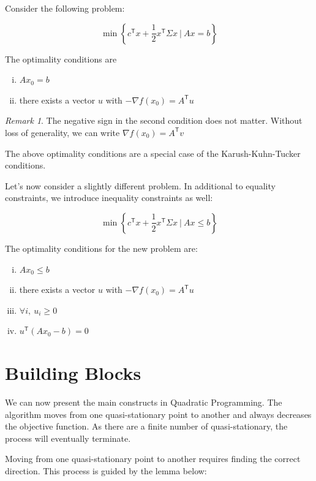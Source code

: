 \documentclass[letterpaper, oneside]{book}
\theoremstyle{definition}
\theoremstyle{remark}
\newtheorem*{remark}{Remark}
\begin{document}
Consider the following problem:

\[
	\min \left\{c^{\mathsf{T}}x + \frac{1}{2}x^{\mathsf{T}}\Sigma{}x \ |\  Ax = b \right\}
\]

The optimality conditions are
\begin{enumerate}[(i)]
	\item $Ax_0 = b$
	\item there exists a vector $u$ with $-\nabla f(x_0) = A^{\mathsf{T}}u$
\end{enumerate}

\begin{remark}
	The negative sign in the second condition does not matter. Without loss of generality, we can write $\nabla f(x_0) = A^{\mathsf{T}}v$
\end{remark}

The above optimality conditions are a special case of the Karush-Kuhn-Tucker conditions.

Let's now consider a slightly different problem. In additional to equality constraints, we introduce inequality constraints as well:

\[
\min \left\{c^{\mathsf{T}}x + \frac{1}{2}x^{\mathsf{T}}\Sigma{}x \ |\  Ax \leqslant b \right\}
\]

The optimality conditions for the new problem are:
\begin{enumerate}[(i)]
	\item $Ax_0 \leqslant b$
	\item there exists a vector $u$ with $-\nabla f(x_0) = A^{\mathsf{T}}u$
	\item $\forall i, \ u_i \geqslant 0$
	\item $u^{\mathsf{T}} (Ax_0 - b) = 0 $
\end{enumerate}


\section{Building Blocks}

We can now present the main constructs in Quadratic Programming. The algorithm moves from one quasi-stationary point to another and always decreases the objective function. As there are a finite number of quasi-stationary, the process will eventually terminate.

Moving from one quasi-stationary point to another requires finding the correct direction. This process is guided by the lemma below:
\end{document}
